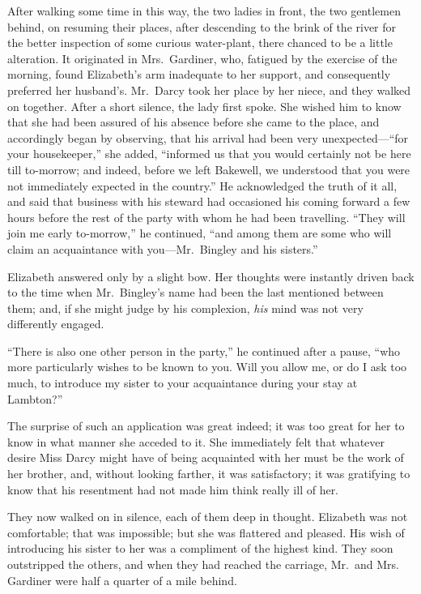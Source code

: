 After walking some time in this way, the two ladies in front,
the two gentlemen behind, on resuming their places, after
descending to the brink of the river for the better inspection of
some curious water-plant, there chanced to be a little alteration.
It originated in Mrs.\ Gardiner, who, fatigued by the exercise of
the morning, found Elizabeth's arm inadequate to her support, and
consequently preferred her husband's.  Mr.\ Darcy took her place
by her niece, and they walked on together.  After a short silence,
the lady first spoke.  She wished him to know that she had
been assured of his absence before she came to the place, and
accordingly began by observing, that his arrival had been very
unexpected---``for your housekeeper,'' she added, ``informed us that
you would certainly not be here till to-morrow; and indeed, before
we left Bakewell, we understood that you were not immediately
expected in the country.''  He acknowledged the truth of it all,
and said that business with his steward had occasioned his coming
forward a few hours before the rest of the party with whom he
had been travelling.  ``They will join me early to-morrow,'' he
continued, ``and among them are some who will claim an acquaintance
with you---Mr.\ Bingley and his sisters.''

Elizabeth answered only by a slight bow.  Her thoughts were
instantly driven back to the time when Mr.\ Bingley's name had
been the last mentioned between them; and, if she might judge
by his complexion, \emph{his} mind was not very differently engaged.

``There is also one other person in the party,'' he continued after
a pause, ``who more particularly wishes to be known to you.
Will you allow me, or do I ask too much, to introduce my sister
to your acquaintance during your stay at Lambton?''

The surprise of such an application was great indeed; it was too
great for her to know in what manner she acceded to it.  She
immediately felt that whatever desire Miss Darcy might have of
being acquainted with her must be the work of her brother, and,
without looking farther, it was satisfactory; it was gratifying to
know that his resentment had not made him think really ill of her.

They now walked on in silence, each of them deep in thought.
Elizabeth was not comfortable; that was impossible; but she was
flattered and pleased.  His wish of introducing his sister to her
was a compliment of the highest kind.  They soon outstripped the
others, and when they had reached the carriage, Mr.\ and Mrs.\ %
Gardiner were half a quarter of a mile behind.

